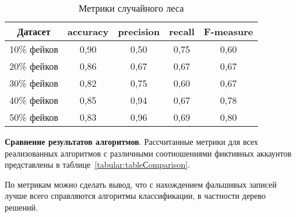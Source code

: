 \vspace{-0.5em}
\begin{table}[H]
    \caption{Метрики случайного леса}
    \vspace{1em}
    \small
    \begin{tabular}{|l|c|c|c|c|}
    \hline
    \multicolumn{1}{|c|}{\textbf{Датасет}} & \textbf{accuracy} & \textbf{precision} & \textbf{recall} & \textbf{F-measure} \\ \hline
    10\% фейков & 0,90 & 0,50 & 0,75 & 0,60 \\ \hline
    20\% фейков & 0,86 & 0,67 & 0,67 & 0,67 \\ \hline
    30\% фейков & 0,82 & 0,75 & 0,60 & 0,67 \\ \hline
    40\% фейков & 0,85 & 0,94 & 0,67 & 0,78 \\ \hline
    50\% фейков & 0,83 & 0,96 & 0,69 & 0,80 \\ \hline
    \end{tabular}
    \label{tabular:tableDecTree}
\end{table}

\textbf{Сравнение результатов алгоритмов}. Рассчитанные метрики для всех реализованных алгоритмов с различными соотношениями фиктивных аккаунтов представлены в таблице~\ref{tabular:tableСomparison}. 

По метрикам можно сделать вывод, что с нахождением фальшивых записей лучше всего справляются алгоритмы классификации, в частности дерево решений.

